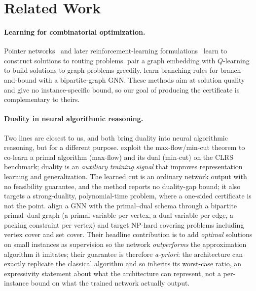\documentclass[11pt]{article}
\theoremstyle{plain}
\theoremstyle{definition}
\theoremstyle{remark}
\begin{document}
\section{Related Work}\label{sec:rel}

\paragraph{Learning for combinatorial optimization.}
Pointer networks~\citep{vinyals2015pointer} and later reinforcement-learning
formulations~\citep{bello2016neural} learn to construct solutions to routing
problems. \citet{khalil2017learning} pair a graph embedding with $Q$-learning to
build solutions to graph problems greedily. \citet{gasse2019exact} learn
branching rules for branch-and-bound with a bipartite-graph GNN. These methods
aim at solution quality and give no instance-specific bound, so our goal of
producing the certificate is complementary to theirs.

\paragraph{Duality in neural algorithmic reasoning.}
Two lines are closest to us, and both bring duality into neural algorithmic
reasoning, but for a different purpose. \citet{numeroso2023dual} exploit the
max-flow/min-cut theorem to co-learn a primal algorithm (max-flow) and its dual
(min-cut) on the CLRS benchmark; duality is an \emph{auxiliary training signal}
that improves representation learning and generalization. The learned cut is an
ordinary network output with no feasibility guarantee, and the method reports no
duality-gap bound; it also targets a strong-duality, polynomial-time problem,
where a one-sided certificate is not the point. \citet{he2025primal} align a GNN
with the primal--dual schema through a bipartite primal--dual graph (a primal
variable per vertex, a dual variable per edge, a packing constraint per vertex)
and target NP-hard covering problems including vertex cover and set cover. Their
headline contribution is to add \emph{optimal} solutions on small instances as
supervision so the network \emph{outperforms} the approximation algorithm it
imitates; their guarantee is therefore \emph{a-priori}: the architecture can
exactly replicate the classical algorithm and so inherits its worst-case
ratio, an expressivity statement about what the architecture can represent,
not a per-instance bound on what the trained network actually output.
\end{document}
